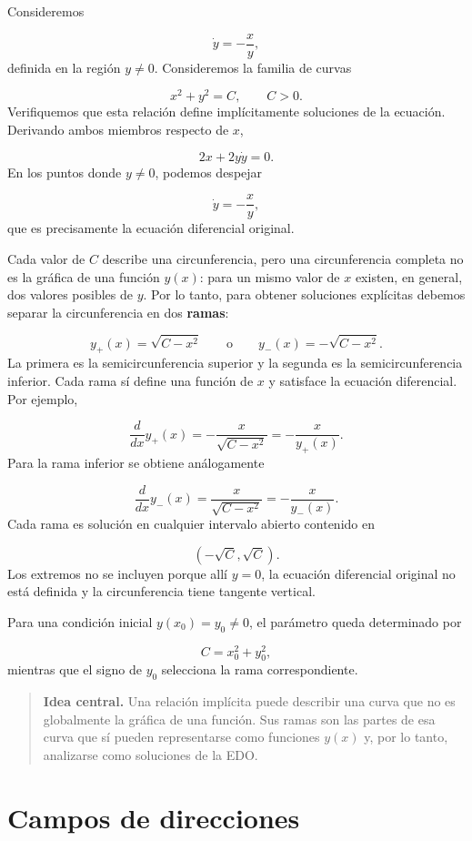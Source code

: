 \documentclass[12pt,a4paper]{article}
\begin{document}
	Consideremos

	\[
	\dot{y}=-\frac{x}{y},
	\]
definida en la región $y\neq 0$. Consideremos la familia de curvas

	\[
	x^2+y^2=C,
	\qquad C>0.
	\]
Verifiquemos que esta relación define implícitamente soluciones de la ecuación. Derivando ambos miembros respecto de \(x\),

	\[
	2x+2y\dot{y}=0.
	\]
En los puntos donde \(y\neq0\), podemos despejar

	\[
	\dot{y}=-\frac{x}{y},
	\]
que es precisamente la ecuación diferencial original.

Cada valor de $C$ describe una circunferencia, pero una circunferencia completa no es la gráfica de una función $y(x)$: para un mismo valor de $x$ existen, en general, dos valores posibles de $y$. Por lo tanto, para obtener soluciones explícitas debemos separar la circunferencia en dos \textbf{ramas}:

	\[
	y_+(x)=\sqrt{C-x^2}
	\qquad\text{o}\qquad
	y_-(x)=-\sqrt{C-x^2}.
	\]
La primera es la semicircunferencia superior y la segunda es la semicircunferencia inferior. Cada rama sí define una función de $x$ y satisface la ecuación diferencial. Por ejemplo,

	\[
	\frac{d}{dx}y_+(x)
	=
	-\frac{x}{\sqrt{C-x^2}}
	=
	-\frac{x}{y_+(x)}.
	\]
Para la rama inferior se obtiene análogamente

	\[
	\frac{d}{dx}y_-(x)
	=
	\frac{x}{\sqrt{C-x^2}}
	=
	-\frac{x}{y_-(x)}.
	\]
Cada rama es solución en cualquier intervalo abierto contenido en

	\[
	(-\sqrt{C},\sqrt{C}).
	\]
Los extremos no se incluyen porque allí $y=0$, la ecuación diferencial original no está definida y la circunferencia tiene tangente vertical.

	Para una condición inicial $y(x_0)=y_0\neq 0$, el parámetro queda determinado por

	\[
	C=x_0^2+y_0^2,
	\]
mientras que el signo de $y_0$ selecciona la rama correspondiente.

	\begin{quote}
		\textbf{Idea central.} Una relación implícita puede describir una curva que no es globalmente la gráfica de una función. Sus ramas son las partes de esa curva que sí pueden representarse como funciones $y(x)$ y, por lo tanto, analizarse como soluciones de la EDO.
	\end{quote}

	\clearpage
	\section{Campos de direcciones}
\end{document}
